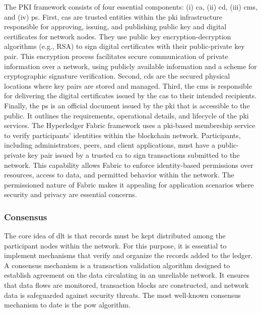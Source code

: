 \documentclass[conference]{IEEEtran}
\begin{document}
The PKI framework consists of four essential components: (i) \ac{ca}, (ii) \ac{cd}, (iii) \ac{cms}, and (iv) \ac{ps}. First, \ac{ca}s are trusted entities within the \ac{pki} infrastructure responsible for approving, issuing, and publishing public key and digital certificates for network nodes. They use public key encryption-decryption algorithms (e.g., RSA) to sign digital certificates with their public-private key pair. This encryption process facilitates secure communication of private information over a network, using publicly available information and a scheme for cryptographic signature verification. Second, \ac{cd}s are the secured physical locations where key pairs are stored and managed. Third, the \ac{cms} is responsible for delivering the digital certificates issued by the \ac{ca}s to their intended recipients. Finally, the \ac{ps} is an official document issued by the \ac{pki} that is accessible to the public. It outlines the requirements, operational details, and lifecycle of the \ac{pki} services. The Hyperledger Fabric framework uses a \ac{pki}-based membership service to verify participants' identities within the blockchain network. Participants, including administrators, peers, and client applications, must have a public-private key pair issued by a trusted \ac{ca} to sign transactions submitted to the network. This capability allows Fabric to enforce identity-based permissions over resources, access to data, and permitted behavior within the network. The permissioned nature of Fabric makes it appealing for application scenarios where security and privacy are essential concerns.\\ 

\subsubsection{Consensus}
The core idea of \ac{dlt} is that records must be kept distributed among the participant nodes within the network. For this purpose, it is essential to implement mechanisms that verify and organize the records added to the ledger. A consensus mechanism is a transaction validation algorithm designed to establish agreement on the data circulating in an unreliable network. It ensures that data flows are monitored, transaction blocks are constructed, and network data is safeguarded against security threats. The most well-known consensus mechanism to date is the \ac{pow} algorithm. \\
\end{document}
